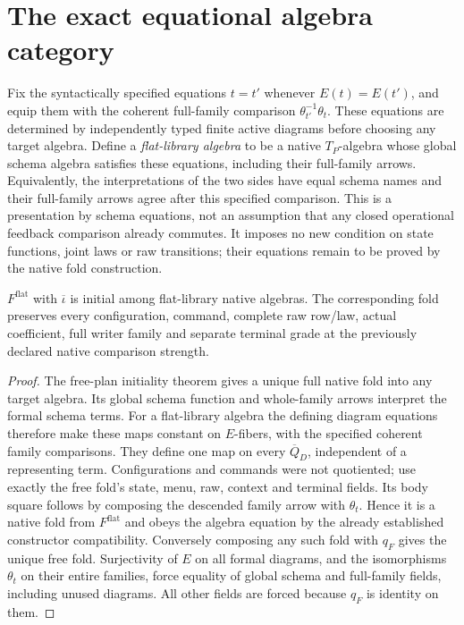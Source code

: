 \documentclass[11pt]{article}
\begin{document}
\section{The exact equational algebra category}
Fix the syntactically specified equations $t=t'$ whenever $E(t)=E(t')$, and equip them with the coherent full-family comparison $\theta_{t'}^{-1}\theta_t$. These equations are determined by independently typed finite active diagrams before choosing any target algebra. Define a \emph{flat-library algebra} to be a native $T_P$-algebra whose global schema algebra satisfies these equations, including their full-family arrows. Equivalently, the interpretations of the two sides have equal schema names and their full-family arrows agree after this specified comparison. This is a presentation by schema equations, not an assumption that any closed operational feedback comparison already commutes. It imposes no new condition on state functions, joint laws or raw transitions; their equations remain to be proved by the native fold construction.

\begin{theorem}
$F^{\mathrm{flat}}$ with $\overline\iota$ is initial among flat-library native algebras. The corresponding fold preserves every configuration, command, complete raw row/law, actual coefficient, full writer family and separate terminal grade at the previously declared native comparison strength.
\end{theorem}
\begin{proof}
The free-plan initiality theorem gives a unique full native fold into any target algebra. Its global schema function and whole-family arrows interpret the formal schema terms. For a flat-library algebra the defining diagram equations therefore make these maps constant on $E$-fibers, with the specified coherent family comparisons. They define one map on every $\overline Q_D$, independent of a representing term. Configurations and commands were not quotiented; use exactly the free fold's state, menu, raw, context and terminal fields. Its body square follows by composing the descended family arrow with $\theta_t$. Hence it is a native fold from $F^{\mathrm{flat}}$ and obeys the algebra equation by the already established constructor compatibility. Conversely composing any such fold with $q_F$ gives the unique free fold. Surjectivity of $E$ on all formal diagrams, and the isomorphisms $\theta_t$ on their entire families, force equality of global schema and full-family fields, including unused diagrams. All other fields are forced because $q_F$ is identity on them.
\end{proof}
\end{document}
